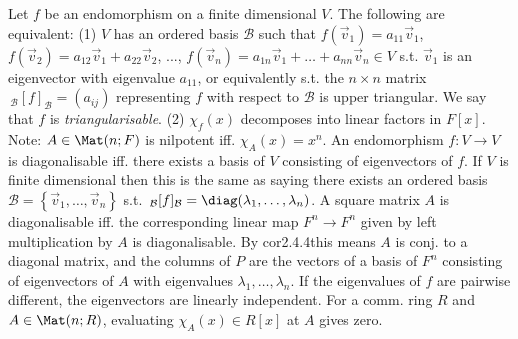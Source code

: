 Let $f$ be an endomorphism on a finite dimensional $V$. The following are equivalent:
(1) $V$ has an ordered basis $\mathcal{B}$ such that $f(\vec{v}_1) = a_{11}\vec{v}_1$, $f(\vec{v}_2) = a_{12}\vec{v}_1 + a_{22}\vec{v}_2$, ..., $f(\vec{v}_n) = a_{1n}\vec{v}_1 + \dots + a_{nn}\vec{v}_n \in V$ s.t. $\vec{v}_1$ is an eigenvector with eigenvalue $a_{11}$, or equivalently s.t. the $n \times n$ matrix $\,_{\mathcal{B}}[f]_{\mathcal{B}} = (a_{ij})$ representing $f$ with respect to $\mathcal{B}$ is upper triangular. We say that $f$ is \emph{triangularisable}.
(2) $\chi_f(x)$ decomposes into linear factors in $F[x]$.
Note: $A \in \Mat(n; F)$  is nilpotent iff. $\chi_A(x) = x^n$.
 An endomorphism $f : V \to V$ is diagonalisable iff. there exists a basis of $V$ consisting of eigenvectors of $f$. If $V$ is finite dimensional then this is the same as saying there exists an ordered basis $\mathcal{B} = \left\{ \vec{v}_1, \dots, \vec{v}_n \right\}$ s.t. $\,_{\mathcal{B}}[f]_{\mathcal{B}} = \diag(\lambda_1, \dots, \lambda_n)$.
A square matrix $A$ is diagonalisable iff. the corresponding linear map $F^n \rightarrow F^n$ given by left multiplication by $A$ is diagonalisable. By cor2.4.4this means $A$ is conj. to a diagonal matrix, and the columns of $P$ are the vectors of a basis of $F^n$ consisting of eigenvectors of $A$ with eigenvalues $\lambda_1, \dots, \lambda_n$.
 If the eigenvalues of $f$ are pairwise different, the eigenvectors are linearly independent.
 For a comm. ring $R$ and $A \in \Mat(n; R)$, evaluating $\chi_A(x) \in R[x]$ at $A$ gives zero.
